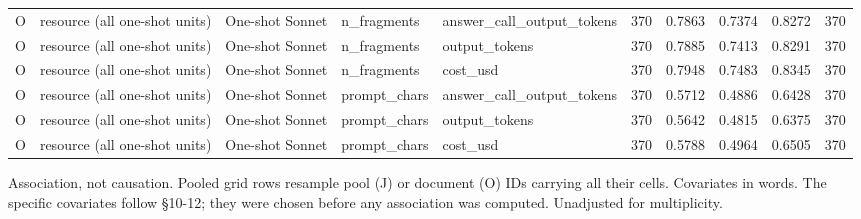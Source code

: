 \begin{table}[t]
{\begin{tabular}{llllllllll}
O & resource (all one-shot units) & One-shot Sonnet & n\_fragments & answer\_call\_output\_tokens & 370 & 0.7863 & 0.7374 & 0.8272 & 370 \\
O & resource (all one-shot units) & One-shot Sonnet & n\_fragments & output\_tokens & 370 & 0.7885 & 0.7413 & 0.8291 & 370 \\
O & resource (all one-shot units) & One-shot Sonnet & n\_fragments & cost\_usd & 370 & 0.7948 & 0.7483 & 0.8345 & 370 \\
O & resource (all one-shot units) & One-shot Sonnet & prompt\_chars & answer\_call\_output\_tokens & 370 & 0.5712 & 0.4886 & 0.6428 & 370 \\
O & resource (all one-shot units) & One-shot Sonnet & prompt\_chars & output\_tokens & 370 & 0.5642 & 0.4815 & 0.6375 & 370 \\
O & resource (all one-shot units) & One-shot Sonnet & prompt\_chars & cost\_usd & 370 & 0.5788 & 0.4964 & 0.6505 & 370 \\
\bottomrule
\end{tabular}}
\par\smallskip\parbox{\linewidth}{\tiny Association, not causation. Pooled grid rows resample pool (J) or document (O) IDs carrying all their cells. Covariates in words. The specific covariates follow §10-12; they were chosen before any association was computed. Unadjusted for multiplicity.}
\end{table}
